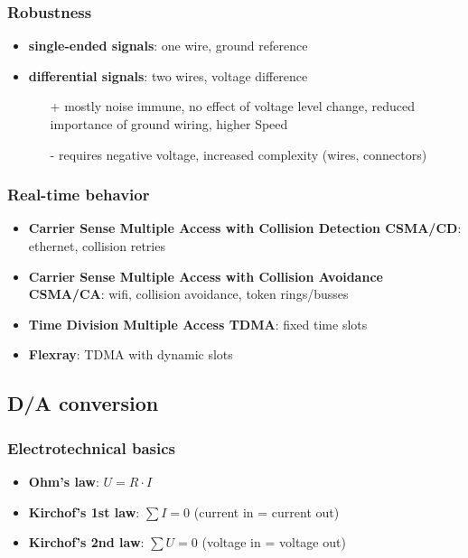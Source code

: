 \documentclass{article}
\begin{document}
\subsubsection{Robustness}
\begin{itemize}
  \item \textbf{single-ended signals}: one wire, ground reference
  \item \textbf{differential signals}: two wires, voltage difference
        \begin{itemize}
          \item[+] mostly noise immune, no effect of voltage level change, reduced importance of ground wiring, higher Speed
          \item[-] requires negative voltage, increased complexity (wires, connectors)
        \end{itemize}
\end{itemize}

\subsubsection{Real-time behavior}

\begin{itemize}
  \item \textbf{Carrier Sense Multiple Access with Collision Detection CSMA/CD}: ethernet, collision retries
  \item \textbf{Carrier Sense Multiple Access with Collision Avoidance CSMA/CA}: wifi, collision avoidance, token rings/busses
  \item \textbf{Time Division Multiple Access TDMA}: fixed time slots
  \item \textbf{Flexray}: TDMA with dynamic slots
\end{itemize}

\subsection{D/A conversion}
\subsubsection{Electrotechnical basics}
\begin{itemize}
  \item \textbf{Ohm's law}: $U = R \cdot I$
  \item \textbf{Kirchof's 1st law}: $\sum I = 0$ (current in = current out)
  \item \textbf{Kirchof's 2nd law}: $\sum U = 0$ (voltage in = voltage out)
\end{itemize}
\end{document}
